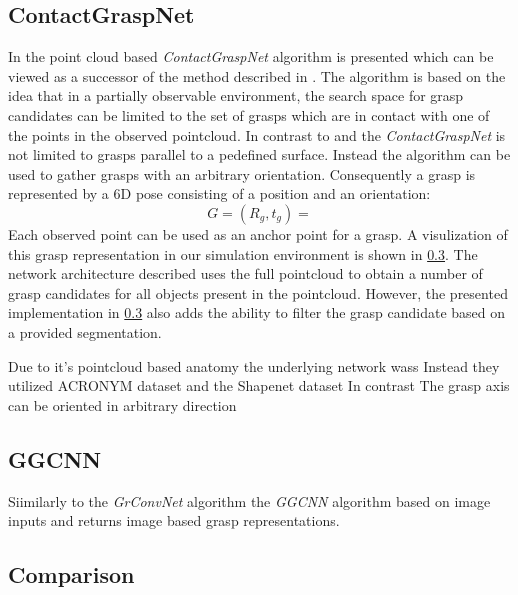 \subsection{ContactGraspNet}
In \cite{sundermeyer2021contact} the point cloud based \textit{ContactGraspNet} algorithm is presented which can be viewed as a successor of the method described in \cite{}.
The algorithm is based on the idea that in a partially observable environment, the search space for grasp candidates can be limited to the set of grasps which are
in contact with one of the points in the observed pointcloud.
In contrast to  and  the \textit{ContactGraspNet} is not limited to grasps parallel to a pedefined surface.
Instead the algorithm can be used to gather grasps with an arbitrary orientation.
Consequently a grasp is represented by a 6D pose consisting of a position and an orientation:
$$ G = (R_g, t_g) = $$
Each observed point can be used as an anchor point for a grasp.
A visulization of this grasp representation in our simulation environment is shown in \ref{}.
The network architecture described uses the full pointcloud to obtain a number of grasp candidates for all objects present in the pointcloud.
However, the presented implementation in \ref{} also adds the ability to filter the grasp candidate based on a provided segmentation.


Due to it's pointcloud based anatomy the underlying network wass
Instead they utilized ACRONYM dataset and the Shapenet dataset
In contrast
The grasp axis can be oriented in arbitrary direction


\subsection{GGCNN}
Siimilarly to the \textit{GrConvNet} algorithm the \textit{GGCNN} algorithm based on image inputs and returns image based grasp representations.
\subsection{Comparison}

